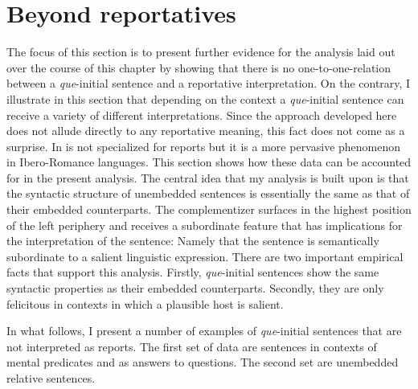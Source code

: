 \section{Beyond reportatives}\label{sec:beyondrep}
The focus of this section is to present further evidence for the analysis laid out over the course of this chapter by showing that there is no one-to-one-relation between a \emph{que}-initial
sentence and a reportative interpretation. On the contrary, I illustrate in this section that depending
on the context a \emph{que}-initial sentence can receive a variety of different interpretations. Since the
approach developed here does not allude directly to any reportative meaning, this fact does not come as a surprise. In is not specialized for reports but it is a more pervasive
phenomenon in Ibero-Romance languages. This section shows how these data can be accounted for in the present analysis. The central idea that my analysis is built upon is that the syntactic structure
of unembedded sentences is essentially the same  as that  of their embedded counterparts. The complementizer surfaces in the highest position of the left periphery and receives
a subordinate feature that has implications for the interpretation of the sentence: Namely
that the sentence is semantically subordinate to a salient linguistic expression. There are two
 important empirical facts that support this analysis. Firstly, \emph{que}-initial sentences show the
same syntactic properties as their embedded counterparts. Secondly, they are only felicitous
in contexts in which a plausible host is salient.


In what follows, I present a number of examples of \emph{que}-initial sentences that are not interpreted
as reports. The first set of data are  sentences in contexts of mental predicates
and as answers to questions. The second set are unembedded relative sentences.

